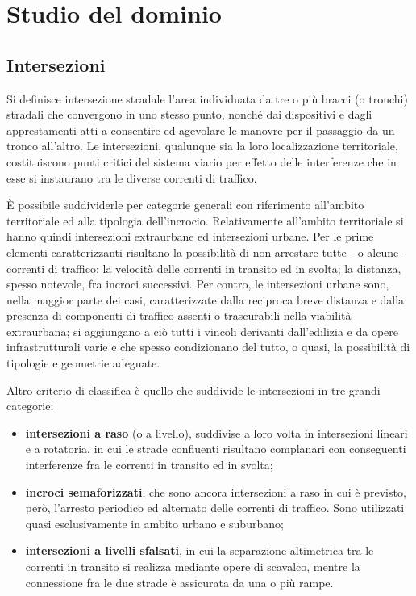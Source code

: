 \chapter{Studio del dominio}

\section{Intersezioni}
Si definisce intersezione stradale l'area individuata da tre o più bracci (o tronchi) stradali che convergono in uno stesso punto, nonché dai dispositivi e dagli apprestamenti atti a consentire ed agevolare le manovre per il passaggio da un tronco all'altro.
Le intersezioni, qualunque sia la loro localizzazione territoriale, costituiscono punti critici del sistema viario per effetto delle interferenze che in esse si instaurano tra le diverse correnti di traffico.

È possibile suddividerle per categorie generali con riferimento all'ambito territoriale ed alla tipologia dell'incrocio. Relativamente all'ambito territoriale si hanno quindi intersezioni extraurbane ed intersezioni urbane. Per le prime elementi caratterizzanti risultano la possibilità di non arrestare tutte - o alcune - correnti di traffico; la velocità delle correnti in transito ed in svolta; la distanza, spesso notevole, fra incroci successivi. Per contro, le intersezioni urbane sono, nella maggior parte dei casi, caratterizzate dalla reciproca breve distanza e dalla presenza di componenti di traffico assenti o trascurabili nella viabilità extraurbana; si aggiungano a ciò tutti i vincoli derivanti dall'edilizia e da opere infrastrutturali varie e che spesso condizionano del tutto, o quasi, la possibilità di tipologie e geometrie adeguate.

Altro criterio di classifica è quello che suddivide le intersezioni in tre grandi categorie:

\begin{itemize}
	\item \textbf{intersezioni a raso} (o a livello), suddivise a loro volta in intersezioni lineari e a rotatoria, in cui le strade confluenti risultano complanari con conseguenti interferenze fra le correnti in transito ed in svolta;
	
	\item \textbf{incroci semaforizzati}, che sono ancora intersezioni a raso in cui è previsto, però, l'arresto periodico ed alternato delle correnti di traffico. Sono utilizzati quasi esclusivamente in ambito urbano e suburbano;
	\item \textbf{intersezioni a livelli sfalsati}, in cui la separazione altimetrica tra le correnti in transito si realizza mediante opere di scavalco, mentre la connessione fra le due strade è assicurata da una o più rampe\cite{esposito2003fondamenti}.
\end{itemize}


